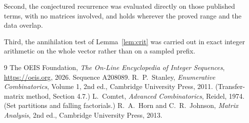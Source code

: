 \documentclass[11pt,a4paper]{article}
\theoremstyle{plain}
\theoremstyle{definition}
\begin{document}
Second, the conjectured recurrence was evaluated directly on those published terms, with no
matrices involved, and holds wherever the proved range and the data overlap.

Third, the annihilation test of Lemma~\ref{lem:crit} was carried out in exact integer
arithmetic on the whole vector rather than on a sampled prefix.

\begin{thebibliography}{9}
 The OEIS Foundation, \emph{The On-Line Encyclopedia of Integer
Sequences}, \url{https://oeis.org}, 2026. Sequence A208089.
 R.~P.~Stanley, \emph{Enumerative Combinatorics}, Volume 1, 2nd ed.,
Cambridge University Press, 2011. (Transfer-matrix method, Section 4.7.)
 L.~Comtet, \emph{Advanced Combinatorics}, Reidel, 1974. (Set partitions
and falling factorials.)
 R.~A.~Horn and C.~R.~Johnson, \emph{Matrix Analysis}, 2nd ed., Cambridge
University Press, 2013.
\end{thebibliography}
\end{document}

